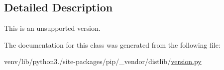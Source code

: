 \subsection{Detailed Description}
\begin{DoxyVerb}This is an unsupported version.\end{DoxyVerb}
 

The documentation for this class was generated from the following file\+:\begin{DoxyCompactItemize}
\item 
venv/lib/python3./site-\/packages/pip/\+\_\+vendor/distlib/\hyperlink{pip_2__vendor_2distlib_2version_8py}{version.\+py}\end{DoxyCompactItemize}
